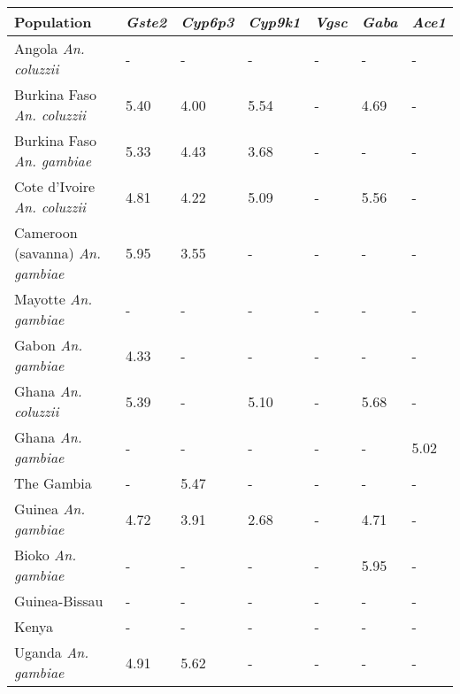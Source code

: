 \begin{tabular}{lllllll}
\toprule
                              Population & \textit{Gste2} & \textit{Cyp6p3} & \textit{Cyp9k1} & \textit{Vgsc} & \textit{Gaba} & \textit{Ace1} \\
\midrule
            Angola \textit{An. coluzzii} &              - &               - &               - &             - &             - &             - \\
      Burkina Faso \textit{An. coluzzii} &           5.40 &            4.00 &            5.54 &             - &          4.69 &             - \\
       Burkina Faso \textit{An. gambiae} &           5.33 &            4.43 &            3.68 &             - &             - &             - \\
     Cote d'Ivoire \textit{An. coluzzii} &           4.81 &            4.22 &            5.09 &             - &          5.56 &             - \\
 Cameroon (savanna) \textit{An. gambiae} &           5.95 &            3.55 &               - &             - &             - &             - \\
            Mayotte \textit{An. gambiae} &              - &               - &               - &             - &             - &             - \\
              Gabon \textit{An. gambiae} &           4.33 &               - &               - &             - &             - &             - \\
             Ghana \textit{An. coluzzii} &           5.39 &               - &            5.10 &             - &          5.68 &             - \\
              Ghana \textit{An. gambiae} &              - &               - &               - &             - &             - &          5.02 \\
                              The Gambia &              - &            5.47 &               - &             - &             - &             - \\
             Guinea \textit{An. gambiae} &           4.72 &            3.91 &            2.68 &             - &          4.71 &             - \\
              Bioko \textit{An. gambiae} &              - &               - &               - &             - &          5.95 &             - \\
                           Guinea-Bissau &              - &               - &               - &             - &             - &             - \\
                                   Kenya &              - &               - &               - &             - &             - &             - \\
             Uganda \textit{An. gambiae} &           4.91 &            5.62 &               - &             - &             - &             - \\
\bottomrule
\end{tabular}
